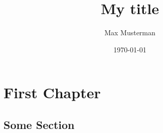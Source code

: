\documentclass[%
  english,ngerman,%
  BCOR=6mm,cdgeometry=no,DIV=13,%
  cd=lightcolor,
  cdfont=normalbold,
  ttfont=true
]{tudscrreprt}
\begin{document}
\begin{titlepage}
\date{ \today}
\author{Max Musterman}
\title{%
  My title
}

\maketitle
\end{titlepage}


\tableofcontents

\chapter{ First Chapter}

\section{ Some Section }
\end{document}

